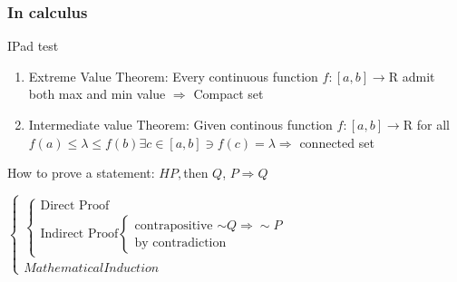 


\cfoot{\thepage} %

\subsubsection{In calculus}

IPad test

\begin{enumerate}
	\item Extreme Value Theorem: Every continuous function $f:[a,b]\rightarrow\mathrm{R}$ admit both max and min value $\Rightarrow$ Compact set
	\item Intermediate value Theorem: Given continous function $f:[a,b]\rightarrow \mathrm{R}$ for all $f(a) \leq \lambda \leq f(b) \exists c \in [a,b] \ni f(c) = \lambda \Rightarrow$ connected set
\end{enumerate}

How to prove a statement: $H P,$then $Q$, $P \Rightarrow Q$

$\begin{cases}
	\begin{cases}
	\text{Direct Proof}\\\text{Indirect Proof}\begin{cases}\text{contrapositive $\sim Q \Rightarrow \sim P$} \\ \text{by contradiction}\end{cases}
	\end{cases}\\
	Mathematical Induction
\end{cases}$


\newpage


\newpage



